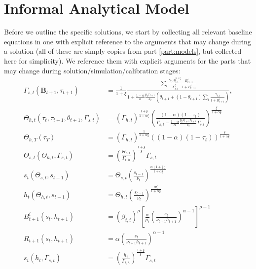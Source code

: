 \documentclass[a4paper]{article}
\begin{document}
\section{Informal Analytical Model}\label{\refsec}
Before we outline the specific solutions, we start by collecting all relevant baseline equations in one with explicit reference to the arguments that may change during a solution (all of these are simply copies from part \ref{part:models}, but collected here for simplicity). We reference them with explicit arguments for the parts that may change during solution/simulation/calibration stages: 
\begin{subequations}\label{\refeq:auxiliary}
    \begin{align}
        \Gamma_{s,t}\left(\bm{B}_{t+1}, \tau_{t+1} \right) &= \frac{1}{1+\xi}\frac{\sum_i \frac{\gamma_{t,i}\eta_{t,i}^{1+\xi}}{X_{t,i}^{\xi}}\frac{B_{t+1}^i}{1+B_{t+1}^i}}{1+\frac{1-\alpha}{\alpha}\frac{p_t\tau_{t+1}}{\kappa_t}\left(\theta_{t+1}+(1-\theta_{t+1})\sum_i\frac{\gamma_{t,i}}{1+B_{t+1}^i}\right)}, 
        \label{\refeq:auxiliary:Gammas} \\
        \Theta_{h,t}\left(\tau_t, \tau_{t+1}, \theta_{t+1}, \Gamma_{s,t}\right) &= \left(\Gamma_{h,t}\right)^{\frac{1+\xi}{1+\alpha\xi}}\left(\frac{(1-\alpha)(1-\tau_t)}{\Gamma_{h,t}-\frac{1-\alpha}{\alpha}\frac{p_t\theta_{t+1}\tau_{t+1}}{\kappa_t}\Gamma_{s,t}}\right)^{\frac{\xi}{1+\alpha\xi}} 
        \label{\refeq:auxiliary:Thetah} \\ 
        \Theta_{h,T}\left(\tau_T\right) &= \left(\Gamma_{h,t}\right)^{\frac{1}{1+\alpha\xi}}\left((1-\alpha)(1-\tau_t)\right)^{\frac{\xi}{1+\alpha\xi}}
        \label{\refeq:auxiliary:ThetahT} \\
        \Theta_{s,t}\left(\Theta_{h,t}, \Gamma_{s,t}\right) &= \left(\frac{\Theta_{h,t}}{\Gamma_{t,h}}\right)^{\frac{1+\xi}{\xi}} \Gamma_{s,t} 
        \label{\refeq:auxiliary:Thetas} \\
        s_t(\Theta_{s,t}, s_{t-1}) &= \Theta_{s,t} \left(\frac{s_{t-1}}{\nu_t}\right)^{\frac{\alpha(1+\xi)}{1+\alpha\xi}} 
        \label{\refeq:auxiliary:s} \\
        h_t\left(\Theta_{h,t}, s_{t-1}\right) &= \Theta_{h,t}\left(\frac{s_{t-1}}{\nu_t}\right)^{\frac{\alpha\xi}{1+\alpha\xi}} \label{\refeq:auxiliary:h} \\ 
        B_{t+1}^i\left(s_t, h_{t+1}\right) &=\left(\beta_{t,i}\right)^{\rho}\left[\frac{\alpha}{p_t}\left(\frac{s_t}{\nu_{t+1}h_{t+1}}\right)^{\alpha-1}\right]^{\rho-1}  
        \label{\refeq:auxiliary:B} \\ 
        R_{t+1}\left(s_t, h_{t+1}\right) &= \alpha \left(\frac{s_t}{\nu_{t+1}h_{t+1}}\right)^{\alpha-1} \label{\refeq:auxiliary:R} \\
        s_t\left(h_t, \Gamma_{s,t}\right) &= \left(\frac{h_t}{\Gamma_{t,h}}\right)^{\frac{1+\xi}{\xi}}\Gamma_{s,t} 
        \label{\refeq:auxiliary:sFromH} 
    \end{align}
\end{subequations}
\end{document}
